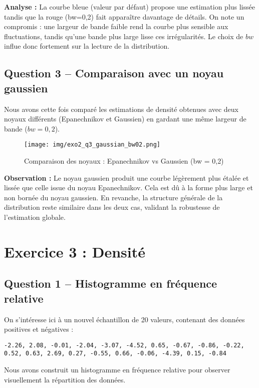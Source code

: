 \documentclass[a4paper,11pt]{article}
\begin{document}
\textbf{Analyse :} La courbe bleue (valeur par défaut) propose une estimation plus lissée tandis que la rouge (bw=0,2) fait apparaître davantage de détails. On note un compromis : une largeur de bande faible rend la courbe plus sensible aux fluctuations, tandis qu'une bande plus large lisse ces irrégularités. Le choix de $bw$ influe donc fortement sur la lecture de la distribution.

\subsection*{Question 3 – Comparaison avec un noyau gaussien}
Nous avons cette fois comparé les estimations de densité obtenues avec deux noyaux différents (Epanechnikov et Gaussien) en gardant une même largeur de bande ($bw = 0{,}2$).

\begin{figure}[H]
    \centering
    \texttt{[image: img/exo2\_q3\_gaussian\_bw02.png]}
    \caption{Comparaison des noyaux : Epanechnikov vs Gaussien (bw = 0{,}2)}
\end{figure}

\textbf{Observation :} Le noyau gaussien produit une courbe légèrement plus étalée et lissée que celle issue du noyau Epanechnikov. Cela est dû à la forme plus large et non bornée du noyau gaussien. En revanche, la structure générale de la distribution reste similaire dans les deux cas, validant la robustesse de l’estimation globale.

\vspace{1em}

\section*{Exercice 3 : Densité}

\subsection*{Question 1 – Histogramme en fréquence relative}
On s’intéresse ici à un nouvel échantillon de 20 valeurs, contenant des données positives et négatives :

\begin{verbatim}
-2.26, 2.08, -0.01, -2.04, -3.07, -4.52, 0.65, -0.67, -0.86, -0.22,
0.52, 0.63, 2.69, 0.27, -0.55, 0.66, -0.06, -4.39, 0.15, -0.84
\end{verbatim}

Nous avons construit un histogramme en fréquence relative pour observer visuellement la répartition des données.
\end{document}
